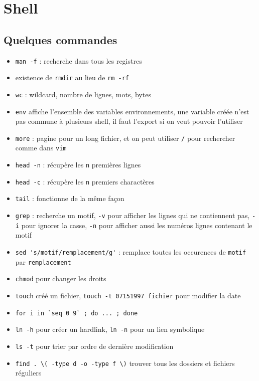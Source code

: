 \newpage
\section{Shell}

\subsection{Quelques commandes}
\begin{itemize}
    \item \verb|man -f| : recherche dans tous les registres
    \item existence de \verb|rmdir| au lieu de \verb|rm -rf|
    \item \verb|wc| : wildcard, nombre de lignes, mots, bytes
    \item \verb|env| affiche l'ensemble des variables environnements, une variable créée n'est pas commune à plusieurs shell, il faut l'export si on veut pouvoir l'utiliser
    \item \verb|more| : pagine pour un long fichier, et on peut utiliser \verb|/| pour rechercher comme dans \verb|vim|
    \item \verb|head -n| : récupère les \verb|n| premières lignes 
    \item \verb|head -c| : récupère les \verb|n| premiers charactères
    \item \verb|tail| : fonctionne de la même façon
    \item \verb|grep| : recherche un motif, \verb|-v| pour afficher les lignes qui ne contiennent pas, \verb|-i| pour ignorer la casse, \verb|-n| pour afficher aussi les numéros lignes contenant le motif
    \item \verb|sed 's/motif/remplacement/g'| : remplace toutes les occurences de \verb|motif| par \verb|remplacement|
    \item \verb|chmod| pour changer les droits
    \item \verb|touch| créé un fichier, \verb|touch -t 07151997 fichier| pour modifier la date
    \item \verb|for i in `seq 0 9` ; do ... ; done|
    \item \verb|ln -h| pour créer un hardlink, \verb|ln -n| pour un lien symbolique
    \item \verb|ls -t| pour trier par ordre de dernière modification
    \item \verb|find . \( -type d -o -type f \)| trouver tous les dossiers et fichiers réguliers
\end{itemize}

